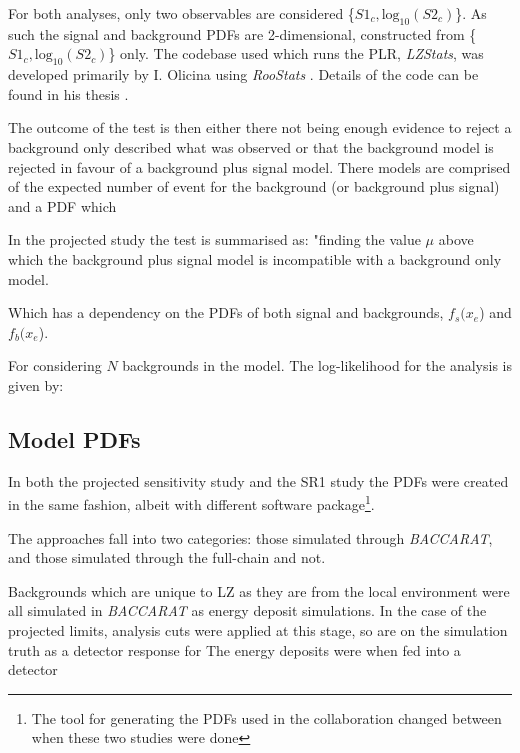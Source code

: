 \par
For both analyses, only two observables are considered \{$S1_c,\text{log}_{10}(S2_c)$\}.
As such the signal and background PDFs are 2-dimensional, constructed from \{$S1_c,\text{log}_{10}(S2_c)$\} only.
The codebase used which runs the PLR, \textit{LZStats}, was developed primarily by I. Olicina using \textit{RooStats} \cite{roostats_ref}.
Details of the code can be found in his thesis \cite{LZ_Ibles_LZStats_Thesis_ref}.


\iffalse
The outcome of the test is then either there not being enough evidence to reject a background only described what was observed or that the background model is rejected in favour of a background plus signal model.
There models are comprised of the expected number of event for the background (or background plus signal) and a PDF which 


\par
In the projected study the test is summarised as:
"finding the value $\mu$ above which the background plus signal model is incompatible with a background only model.

Which has a dependency on the PDFs of both signal and backgrounds, $f_s($\textbf{$x_e$}) and $f_b($\textbf{$x_e$}).

For considering $N$ backgrounds in the model.
The log-likelihood for the analysis is given by:



\subsection{Model PDFs}
\par
In both the projected sensitivity study and the SR1 study the PDFs were created in the same fashion, albeit with different software package\footnote{The tool for generating the PDFs used in the collaboration changed between when these two studies were done}.



The approaches fall into two categories: those simulated through \textit{BACCARAT}, and those  simulated through the full-chain and not.

\par
Backgrounds which are unique to LZ as they are from the local environment were all simulated in \textit{BACCARAT} as energy deposit simulations.
In the case of the projected limits, analysis cuts were applied at this stage, so are on the simulation truth as a detector response for 
The energy deposits were when fed into a detector


